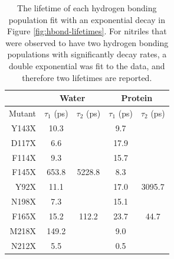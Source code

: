 \begin{table}
    \caption[Estimated lifetimes of hydrogen bonding interactions]{
        The lifetime of each hydrogen bonding population fit with an exponential decay in Figure \ref{fig:hbond-lifetimes}. 
        For nitriles that were observed to have two hydrogen bonding populations with significantly decay rates, a double exponential was fit to the data, and therefore two lifetimes are reported.
    }
    \begin{center}
    \begin{tabular}{r | c c | c c}
    & \multicolumn{2}{c}{Water} & \multicolumn{2}{c}{Protein}\\
    \toprule
        Mutant &  $\tau_1$ (ps)  & $\tau_2$ (ps) &  $\tau_1$ (ps) & $\tau_2$ (ps) \\
    \midrule
    
        Y143X & 10.3  &        & 9.7   &          \\
        D117X & 6.6   &        & 17.9  &          \\
        F114X & 9.3   &        & 15.7  &          \\
        F145X & 653.8 & 5228.8 & 8.3   &          \\
        Y92X  & 11.1  &        & 17.0  & 3095.7   \\
        N198X & 7.3   &        & 15.1  &          \\
        F165X & 15.2  & 112.2  & 23.7  & 44.7     \\
        M218X & 149.2 &        & 9.0   &          \\
        N212X & 5.5   &        & 0.5   &          \\
    
    
    \bottomrule
    \end{tabular}
    \end{center}
    \label{tbl:hbond-lifetimes}
\end{table}

